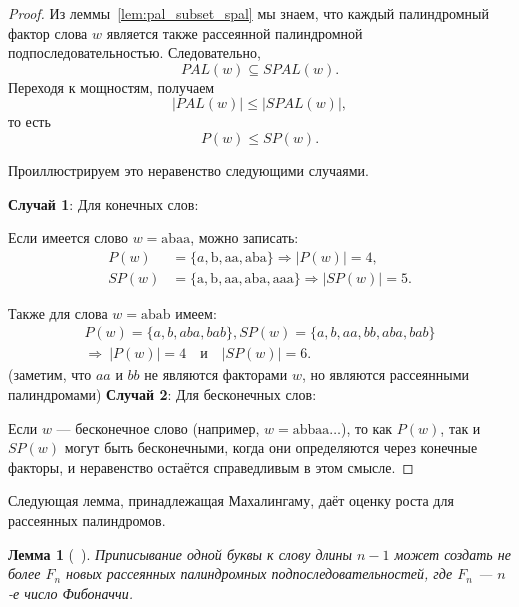 \documentclass[a4paper,14pt]{extreport}
\theoremstyle{plain}
\newtheorem{lemma}{Лемма}[section]
\theoremstyle{definition}
\theoremstyle{remark}
\begin{document}
\begin{proof}
	Из леммы~\ref{lem:pal_subset_spal} мы знаем, что каждый палиндромный фактор слова $w$ является также рассеянной палиндромной подпоследовательностью. Следовательно,
	\begin{equation}
		PAL(w) \subseteq SPAL(w).
	\end{equation}
	Переходя к мощностям, получаем
	\begin{equation}
		|PAL(w)| \leq |SPAL(w)|,
	\end{equation}
	то есть
	\begin{equation}
		P(w) \leq SP(w).
	\end{equation}
	
	Проиллюстрируем это неравенство следующими случаями.
	
	\textbf{Случай 1}: Для конечных слов:
	
	Если имеется слово $w=\mathrm{abaa}$, можно записать:
	\begin{equation}
		\begin{aligned}
			P(w)&=\{a, \mathrm{b}, \mathrm{aa}, \mathrm{aba}\} \Rightarrow |P(w)|=4,\\
			SP(w)&=\{\mathrm{a}, \mathrm{b}, \mathrm{aa}, \mathrm{aba}, \mathrm{aaa}\} \Rightarrow |SP(w)|=5.
		\end{aligned}
	\end{equation}
	
	Также для слова $w=\mathrm{abab}$ имеем:
	\begin{equation}
		\begin{aligned}
			P(w)=\{{a}, {b}, {aba}, {bab}\} ,	
			SP(w)=\{{a}, {b}, {aa}, {bb}, {aba}, {bab}\} \\
			\Rightarrow\ |P(w)|=4 \quad \text{и} \quad |SP(w)|=6.
		\end{aligned}
	\end{equation}
	(заметим, что $aa$ и $bb$ не являются факторами $w$, но являются рассеянными палиндромами)
	\textbf{Случай 2}: Для бесконечных слов:
	
	Если $w$ --- бесконечное слово (например, $w=\mathrm{abbaa\ldots}$), то как $P(w)$, так и $SP(w)$ могут быть бесконечными, когда они определяются через конечные факторы, и неравенство остаётся справедливым в этом смысле.
\end{proof}

Следующая лемма, принадлежащая Махалингаму, даёт оценку роста для рассеянных палиндромов. 

\begin{lemma}[~\cite{Mahalingam}] Приписывание одной буквы к слову длины $n-1$ может создать не более $F_n$ новых рассеянных палиндромных подпоследовательностей, где $F_n$ --- $n$-е число Фибоначчи. \end{lemma}
\end{document}
